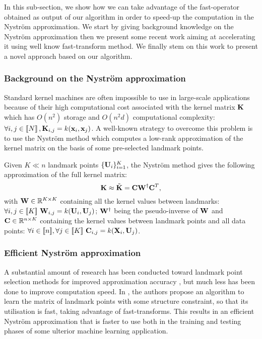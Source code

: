 In this sub-section, we show how we can take advantage of the fast-operator obtained as output of our \qkmeans algorithm in order to speed-up the computation in the Nyström approximation. 
We start by giving background knowledge on the Nyström approximation then we present some recent work aiming at accelerating it using well know fast-transform method. 
We finally stem on this work to present a novel approach based on our \qkmeans algorithm.

\subsubsection{Background on the Nyström approximation}

Standard kernel machines are often impossible to use in large-scale applications because of their high computational cost associated with the kernel matrix ${\mathbf{K}}$ which has $O(n^2)$ storage and $O(n^2d)$ computational complexity: $\forall i,j \in\left \llbracket N\right \rrbracket, {\mathbf{K}}_{i,j} = k({\mathbf{x}}_i, {\mathbf{x}}_j)$. A well-known strategy to overcome this problem is to use the Nyström method which computes a low-rank approximation of the kernel matrix on the basis of some pre-selected landmark points. 

Given $K \ll n$ landmark points $\{{\mathbf{U}}_i\}_{i=1}^{K}$, the Nyström method gives the following approximation of the full kernel matrix:
%
\begin{equation}
 \label{eq:nystrom}
 {\mathbf{K}} \approx \tilde{{\mathbf{K}}} = {\mathbf{C}}{\mathbf{W}}^\dagger{\mathbf{C}}^T,
\end{equation}
%
with ${\mathbf{W}} \in \mathbb{R}^{K \times K}$ containing all the kernel values between landmarks: $\forall i,j \in [\![K]\!]~ {\mathbf{W}}_{i,j} = k({\mathbf{U}}_i, {\mathbf{U}}_j)$; ${\mathbf{W}}^\dagger$ being the pseudo-inverse of ${\mathbf{W}}$ and ${\mathbf{C}} \in \mathbb{R}^{n \times K}$ containing the kernel values between landmark points and all data points: $\forall i \in [\![n]\!], \forall j \in [\![K]\!]~ {\mathbf{C}}_{i, j} = k({\mathbf{X}}_i, {\mathbf{U}}_j)$.

\subsubsection{Efficient Nyström approximation}

A substantial amount of research has been conducted toward landmark point selection methods for improved approximation accuracy \cite{kumar2012sampling} \cite{musco2017recursive}, but much less has been done to improve computation speed. In \cite{si2016computationally}, the authors propose an algorithm to learn the matrix of landmark points with some structure constraint, so that its utilisation is fast, taking advantage of fast-transforms. This results in an efficient Nyström approximation that is faster to use both in the training and testing phases of some ulterior machine learning application.

